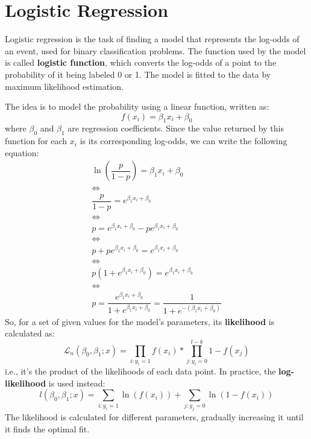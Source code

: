\chapter{Logistic Regression}

Logistic regression is the task of finding a model that represents the log-odds of an event, used for binary classification problems. The function used by the model is called \textbf{logistic function}, which converts the log-odds of a point to the probability of it being labeled 0 or 1. The model is fitted to the data by maximum likelihood estimation.

The idea is to model the probability using a linear function, written as:
\begin{equation*}
    f(x_i) = \beta_1 x_i + \beta_0
\end{equation*}
where $\beta_0$ and $\beta_1$ are regression coefficients. Since the value returned by this function for each $x_i$ is its corresponding log-odds, we can write the following equation:
\begin{gather*}
    \ln \left (\dfrac{p}{1-p} \right ) = \beta_1 x_i + \beta_0 \\
    \iff \\
    \dfrac{p}{1-p} = e^{\beta_1 x_i + \beta_0} \\
    \iff \\
    p = e^{\beta_1 x_i + \beta_0} - p e^{\beta_1 x_i + \beta_0} \\
    \iff \\
    p + p e^{\beta_1 x_i + \beta_0} = e^{\beta_1 x_i + \beta_0} \\
    \iff \\
    p (1 + e^{\beta_1 x_i + \beta_0}) = e^{\beta_1 x_i + \beta_0} \\
    \iff \\
    \boxed{p = \dfrac{e^{\beta_1 x_i + \beta_0}}{1 + e^{\beta_1 x_i + \beta_0}} = \dfrac{1}{1 + e^{-(\beta_1 x_i + \beta_0)}}}
\end{gather*}
So, for a set of given values for the model's parameters, its \textbf{likelihood} is calculated as:
\begin{equation*}
    \mathcal{L}_n(\beta_0, \beta_1; x) = \prod_{i: y_i = 1} f(x_i) * \prod_{j: y_i = 0}^{l-k} 1 - f(x_j)
\end{equation*}
i.e., it's the product of the likelihoods of each data point. In practice, the \textbf{log-likelihood} is used instead:
\begin{equation*}
    l(\beta_0, \beta_1; x) = \sum_{i: y_i = 1} \ln(f(x_i)) + \sum_{j: y_j = 0} \ln(1 - f(x_i))
\end{equation*}
The likelihood is calculated for different parameters, gradually increasing it until it finds the optimal fit.